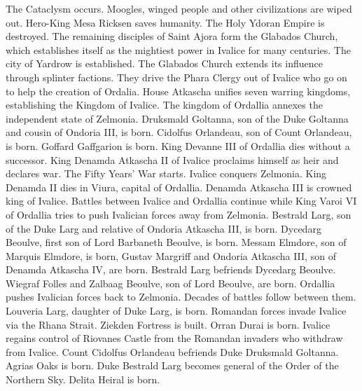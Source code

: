 %
 The Cataclysm occurs. Moogles, winged people and other civilizations are wiped out. Hero-King Mesa Ricksen saves humanity. The Holy Ydoran Empire is destroyed.\nlwb
%
 The remaining disciples of Saint Ajora form the Glabados Church, which establishes itself as the mightiest power in Ivalice for many centuries.\nlwb
%
 The city of Yardrow is established.\nlwb
%
 The Glabados Church extends its influence through splinter factions. They drive the Phara Clergy out of Ivalice who go on to help the creation of Ordalia.\nlwb
%
 House Atkascha unifies seven warring kingdoms, establishing the Kingdom of Ivalice.\nlwb
%
 The kingdom of Ordallia annexes the independent state of Zelmonia.\nlwb
%
 Druksmald Goltanna, son of the Duke Goltanna and cousin of Ondoria III, is born. Cidolfus Orlandeau, son of Count Orlandeau, is born.\nlwb
%
 Goffard Gaffgarion is born. King Devanne III of Ordallia dies without a successor. King Denamda Atkascha II of Ivalice proclaims himself as heir and declares war. The Fifty Years' War starts.\nlwb
%
 Ivalice conquers Zelmonia. King Denamda II dies in Viura, capital of Ordallia. Denamda Atkascha III is crowned king of Ivalice. Battles between Ivalice and Ordallia continue while King Varoi VI of Ordallia tries to push Ivalician forces away from Zelmonia.\nlwb
%
 Bestrald Larg, son of the Duke Larg and relative of Ondoria Atkascha III, is born. Dycedarg Beoulve, first son of Lord Barbaneth Beoulve, is born.\nlwb
%
 Messam Elmdore, son of Marquis Elmdore, is born, Gustav Margriff and Ondoria Atkascha III, son of Denamda Atkascha IV, are born.
%
\newpage
%
 Bestrald Larg befriends Dycedarg Beoulve. Wiegraf Folles and Zalbaag Beoulve, son of Lord Beoulve, are born. \nlwb
%
 Ordallia pushes Ivalician forces back to Zelmonia. Decades of battles follow between them. Louveria Larg, daughter of Duke Larg, is born.\nlwb
%
 Romandan forces invade Ivalice via the Rhana Strait. Ziekden Fortress is built. Orran Durai is born.\nlwb
%
 Ivalice regains control of Riovanes Castle from the Romandan invaders who withdraw from Ivalice. Count Cidolfus Orlandeau befriends Duke Druksmald Goltanna. Agrias Oaks is born.\nlwb
%
 Duke Bestrald Larg becomes general of the Order of the Northern Sky. Delita Heiral is born.\nlwb
